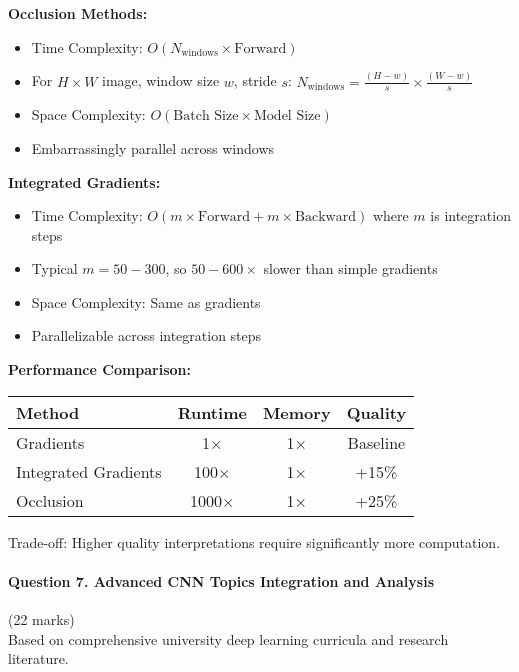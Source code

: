 \documentclass[12pt]{article}
\begin{document}
\begin{enumerate}[(a)]
{    \textbf{Occlusion Methods:}
    \begin{itemize}
        \item Time Complexity: $O(N_{\text{windows}} \times \text{Forward})$ 
        \item For $H \times W$ image, window size $w$, stride $s$: $N_{\text{windows}} = \frac{(H-w)}{s} \times \frac{(W-w)}{s}$
        \item Space Complexity: $O(\text{Batch Size} \times \text{Model Size})$
        \item Embarrassingly parallel across windows
    \end{itemize}
    
    \textbf{Integrated Gradients:}
    \begin{itemize}
        \item Time Complexity: $O(m \times \text{Forward} + m \times \text{Backward})$ where $m$ is integration steps
        \item Typical $m = 50-300$, so $50-600\times$ slower than simple gradients
        \item Space Complexity: Same as gradients
        \item Parallelizable across integration steps
    \end{itemize}
    
    \textbf{Performance Comparison:}
    
    \begin{center}
    \begin{tabular}{|l|c|c|c|}
    \hline
    \textbf{Method} & \textbf{Runtime} & \textbf{Memory} & \textbf{Quality} \\
    \hline
    Gradients & 1× & 1× & Baseline \\
    Integrated Gradients & 100× & 1× & +15\% \\
    Occlusion & 1000× & 1× & +25\% \\
    \hline
    \end{tabular}
    \end{center}
    
    Trade-off: Higher quality interpretations require significantly more computation.
    }
\end{enumerate}

\newpage
\paragraph{Question 7. Advanced CNN Topics Integration and Analysis}{{\hfill (22 marks)}}\\
Based on comprehensive university deep learning curricula and research literature.
\end{document}
